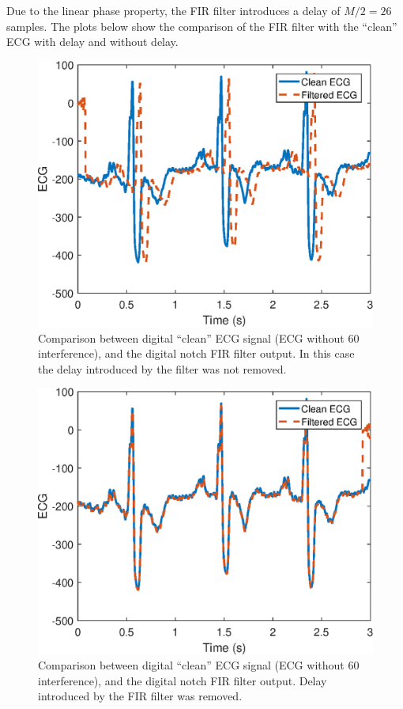 \documentclass{article}
\begin{document}
Due to the linear phase property, the FIR filter introduces a delay of $M/2 = 26$ samples. The plots below show the comparison of the FIR filter with the ``clean'' ECG with delay and without delay.

\FloatBarrier
\begin{figure}[h!]
	\centering
	\includegraphics[scale=0.9]{figs/ecg_fir_comparison1.eps}
	\caption{Comparison between digital ``clean'' ECG signal (ECG without 60 interference), and the digital notch FIR filter output. In this case the delay introduced by the filter was not removed. } \label{fig:egc:fir_comparison1}
\end{figure}
\FloatBarrier

\FloatBarrier
\begin{figure}[h!]
	\centering
	\includegraphics[scale=0.9]{figs/ecg_fir_comparison2.eps}
	\caption{Comparison between digital ``clean'' ECG signal (ECG without 60 interference), and the digital notch FIR filter output. Delay introduced by the FIR filter was removed.} \label{fig:egc:fir_comparison2}
\end{figure}
\FloatBarrier
\end{document}
